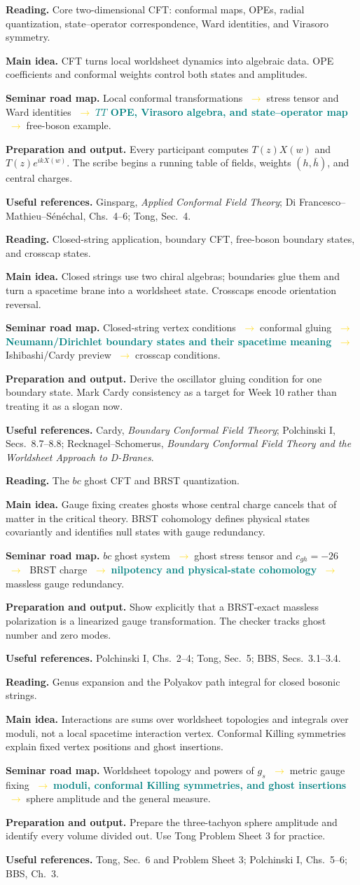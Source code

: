\documentclass[11pt]{article}
\newcommand{\essential}[1]{\textcolor{teal}{\textbf{#1}}}
\newcommand{\roadarrow}{\textcolor{gold}{\ensuremath{\;\longrightarrow\;}}}
\newcommand{\seminarweek}[7]{%
  \begin{tcolorbox}[
    enhanced,
    colback=white,colframe=navy,
    boxrule=0.65pt,arc=1.5mm,
    left=3mm,right=3mm,top=2mm,bottom=2mm,
    title={#1\hfill\normalfont #2},
    fonttitle=\bfseries,coltitle=white,colbacktitle=navy
  ]
  \textbf{Reading.} #3

  \textbf{Main idea.} #4

  \textbf{Seminar road map.} #5

  \textbf{Preparation and output.} #6

  \textbf{Useful references.} #7
  \end{tcolorbox}
}
\begin{document}
\seminarweek{Week 5}{Ch.~4.1, pp.~63--84}
{Core two-dimensional CFT: conformal maps, OPEs, radial quantization,
state--operator correspondence, Ward identities, and Virasoro symmetry.}
{CFT turns local worldsheet dynamics into algebraic data.  OPE coefficients and
conformal weights control both states and amplitudes.}
{Local conformal transformations \roadarrow stress tensor and Ward identities
\roadarrow \essential{$TT$ OPE, Virasoro algebra, and state--operator map}
\roadarrow free-boson example.}
{Every participant computes $T(z)X(w)$ and $T(z)e^{ikX(w)}$.  The scribe begins
a running table of fields, weights $(h,\bar h)$, and central charges.}
{Ginsparg, \emph{Applied Conformal Field Theory}; Di Francesco--Mathieu--S\'en\'echal,
Chs.~4--6; Tong, Sec.~4.}

\seminarweek{Week 6}{Ch.~4.2--4.5, pp.~85--106}
{Closed-string application, boundary CFT, free-boson boundary states, and
crosscap states.}
{Closed strings use two chiral algebras; boundaries glue them and turn a
spacetime brane into a worldsheet state.  Crosscaps encode orientation reversal.}
{Closed-string vertex conditions \roadarrow conformal gluing \roadarrow
\essential{Neumann/Dirichlet boundary states and their spacetime meaning}
\roadarrow Ishibashi/Cardy preview \roadarrow crosscap conditions.}
{Derive the oscillator gluing condition for one boundary state.  Mark Cardy
consistency as a target for Week 10 rather than treating it as a slogan now.}
{Cardy, \emph{Boundary Conformal Field Theory}; Polchinski I, Secs.~8.7--8.8;
Recknagel--Schomerus, \emph{Boundary Conformal Field Theory and the Worldsheet
Approach to D-Branes}.}

\seminarweek{Week 7}{Ch.~5, pp.~107--120}
{The $bc$ ghost CFT and BRST quantization.}
{Gauge fixing creates ghosts whose central charge cancels that of matter in the
critical theory.  BRST cohomology defines physical states covariantly and
identifies null states with gauge redundancy.}
{$bc$ ghost system \roadarrow ghost stress tensor and $c_{gh}=-26$ \roadarrow
BRST charge \roadarrow \essential{nilpotency and physical-state cohomology}
\roadarrow massless gauge redundancy.}
{Show explicitly that a BRST-exact massless polarization is a linearized gauge
transformation.  The checker tracks ghost number and zero modes.}
{Polchinski I, Chs.~2--4; Tong, Sec.~5; BBS, Secs.~3.1--3.4.}

\seminarweek{Week 8}{Ch.~6.1--6.2, pp.~121--145}
{Genus expansion and the Polyakov path integral for closed bosonic strings.}
{Interactions are sums over worldsheet topologies and integrals over moduli,
not a local spacetime interaction vertex.  Conformal Killing symmetries explain
fixed vertex positions and ghost insertions.}
{Worldsheet topology and powers of $g_s$ \roadarrow metric gauge fixing
\roadarrow \essential{moduli, conformal Killing symmetries, and ghost
insertions} \roadarrow sphere amplitude and the general measure.}
{Prepare the three-tachyon sphere amplitude and identify every volume divided
out.  Use Tong Problem Sheet 3 for practice.}
{Tong, Sec.~6 and Problem Sheet 3; Polchinski I, Chs.~5--6; BBS, Ch.~3.}
\end{document}
